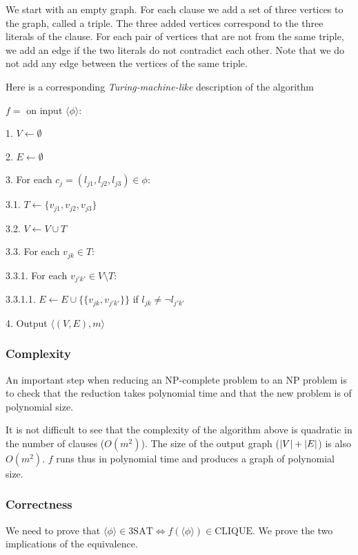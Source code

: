 We start with an empty graph. For each clause we add a set of three vertices to
the graph, called a triple. The three added vertices correspond to the three
literals of the clause. For each pair of vertices that are not from the same
triple, we add an edge if the two literals do not contradict each other. Note
that we do not add any edge between the vertices of the same triple.

Here is a corresponding \emph{Turing-machine-like} description of the algorithm
\begin{TMachine}{\(f =\) on input \(\langle \phi \rangle\):}
\item[1.] \(V \gets \emptyset\)
\item[2.] \(E \gets \emptyset\)
\item[3.] For each \(c_j = (l_{j1},l_{j2},l_{j3}) \in \phi\):
\item[3.1.] \(T \gets \{v_{j1},v_{j2},v_{j3}\}\)
\item[3.2.] \(V \gets V \cup T\)
\item[3.3.] For each \(v_{jk} \in T\):
\item[3.3.1.] For each \(v_{j'k'} \in V \setminus T\):
\item[3.3.1.1.] \(E \gets E \cup \{\{v_{jk},v_{j'k'}\}\}\) if \(l_{jk} \neq \lnot l_{j'k'}\)
\item[4.] Output \(\langle (V,E) , m \rangle\)
\end{TMachine}

\subsubsection{Complexity}
An important step when reducing an NP-complete problem to an NP problem is to
check that the reduction takes polynomial time and that the new problem is of
polynomial size.

It is not difficult to see that the complexity of the algorithm above is
quadratic in the number of clauses (\(O(m^2)\)). The size of the output graph
(\(|V| + |E|\)) is also \(O(m^2)\). \(f\) runs thus in polynomial
time and produces a graph of polynomial size.

\subsubsection{Correctness}

We need to prove that \(\langle \phi \rangle \in \text{3SAT} \iff f(\langle \phi \rangle) \in
\text{CLIQUE}\). We prove the two implications of the equivalence.

